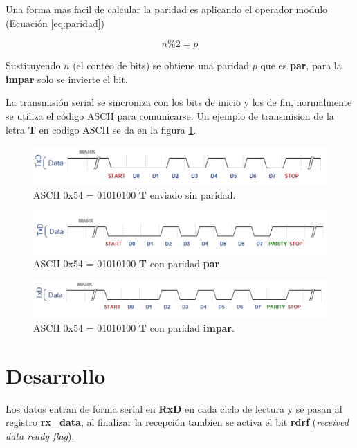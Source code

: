 \documentclass[11pt]{article}
\begin{document}
Una forma mas facil de calcular la paridad es aplicando el operador
modulo (Ecuación \ref{eq:paridad})

\begin{equation}\label{eq:paridad}
n\%2=p
\end{equation}

Sustituyendo \(n\) (el conteo de bits) se obtiene una paridad \(p\)
que es \textbf{par}, para la \textbf{impar} solo se invierte el bit.

La transmisión serial se sincroniza con los bits de inicio y los de
fin, normalmente se utiliza el código ASCII para comunicarse. Un
ejemplo de transmision de la letra \textbf{T} en codigo ASCII se da en la
figura \ref{fig:orgparagraph3}.

\begin{figure}[htb]
\centering
\includegraphics[width=.9\linewidth]{data/ee/9af60f-ed89-4c22-8d7b-e73cc7c9184d/screenshot-20160222-141608.png}
\caption{\label{fig:orgparagraph3}
ASCII 0x54 = 01010100 \textbf{T} enviado sin paridad.}
\end{figure}

\begin{figure}[htb]
\centering
\includegraphics[width=.9\linewidth]{data/ee/9af60f-ed89-4c22-8d7b-e73cc7c9184d/screenshot-20160222-142005.png}
\caption{\label{fig:orgparagraph4}
ASCII 0x54 = 01010100 \textbf{T} con paridad \textbf{par}.}
\end{figure}

\begin{figure}[htb]
\centering
\includegraphics[width=.9\linewidth]{data/ee/9af60f-ed89-4c22-8d7b-e73cc7c9184d/screenshot-20160222-142042.png}
\caption{\label{fig:orgparagraph5}
ASCII 0x54 = 01010100 \textbf{T} con paridad \textbf{impar}.}
\end{figure}
\newpage
\section{Desarrollo}
\label{sec:orgheadline3}
Los datos entran de forma serial en \textbf{RxD} en cada ciclo de lectura y
se pasan al registro \textbf{rx\_data}, al finalizar la recepción tambien se
activa el bit \textbf{rdrf} (\emph{received data ready flag}).
\end{document}
